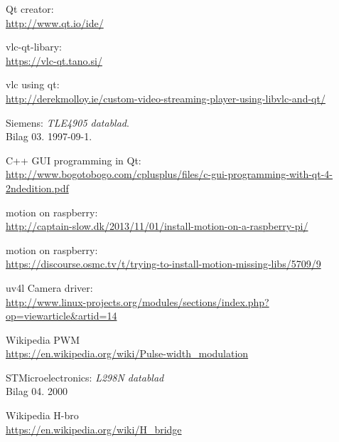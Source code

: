 \begin{thebibliography}{2}
 Qt creator: \\
\url{http://www.qt.io/ide/}

 vlc-qt-libary: \\
\url{https://vlc-qt.tano.si/}

 vlc using qt: \\
\url{http://derekmolloy.ie/custom-video-streaming-player-using-libvlc-and-qt/}

 Siemens: \textit{TLE4905 datablad}. \\
Bilag 03. 1997-09-1.

 C++ GUI programming in Qt: \\
\url{http://www.bogotobogo.com/cplusplus/files/c-gui-programming-with-qt-4-2ndedition.pdf}

 motion on raspberry: \\
\url{http://captain-slow.dk/2013/11/01/install-motion-on-a-raspberry-pi/}

 motion on raspberry: \\
\url{https://discourse.osmc.tv/t/trying-to-install-motion-missing-libs/5709/9}

 uv4l Camera driver: \\
\url{http://www.linux-projects.org/modules/sections/index.php?op=viewarticle&artid=14}

 Wikipedia PWM \\
\url{https://en.wikipedia.org/wiki/Pulse-width_modulation}


 STMicroelectronics: \textit{L298N datablad} \\
Bilag 04. 2000


 Wikipedia H-bro \\
\url{https://en.wikipedia.org/wiki/H_bridge}

\end{thebibliography}